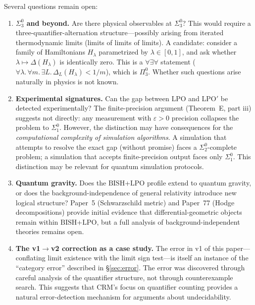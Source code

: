 \documentclass[11pt,a4paper]{article}
\theoremstyle{plain}
\theoremstyle{definition}
\newcommand{\LPO}{\ensuremath{\mathrm{LPO}}}
\newcommand{\LPOj}{\ensuremath{\mathrm{LPO'}}}
\newcommand{\BISH}{\ensuremath{\mathrm{BISH}}}
\begin{document}
Several questions remain open:
\begin{enumerate}[nosep]
\item \textbf{$\Sigma_3^0$ and beyond.}  Are there physical observables
  at $\Sigma_3^0$?  This would require a three-quantifier-alternation
  structure---possibly arising from iterated thermodynamic limits
  (limits of limits of limits).  A candidate: consider a family of
  Hamiltonians $H_\lambda$ parametrized by $\lambda \in [0,1]$, and
  ask whether $\lambda \mapsto \Delta(H_\lambda)$ is identically zero.
  This is a $\forall\exists\forall$ statement ($\forall \lambda.\,
  \forall m.\, \exists L.\, \Delta_L(H_\lambda) < 1/m$), which is
  $\Pi_3^0$.  Whether such questions arise naturally in physics is
  not known.

\item \textbf{Experimental signatures.}  Can the gap between $\LPO$
  and $\LPOj$ be detected experimentally?  The finite-precision
  argument (Theorem~E, part iii) suggests not directly: any
  measurement with $\varepsilon > 0$ precision collapses the problem
  to $\Sigma_1^0$.  However, the distinction may have consequences
  for the \emph{computational complexity of simulation algorithms}.
  A simulation that attempts to resolve the exact gap (without
  promise) faces a $\Sigma_2^0$-complete problem; a simulation
  that accepts finite-precision output faces only $\Sigma_1^0$.
  This distinction may be relevant for quantum simulation protocols.

\item \textbf{Quantum gravity.}  Does the $\BISH$+$\LPO$ profile
  extend to quantum gravity, or does the background-independence
  of general relativity introduce new logical structure?  Paper~5
  (Schwarzschild metric) and Paper~77 (Hodge decompositions)
  provide initial evidence that differential-geometric objects
  remain within $\BISH$+$\LPO$, but a full analysis of
  background-independent theories remains open.

\item \textbf{The v1$\to$v2 correction as a case study.}
  The error in v1 of this paper---conflating limit existence
  with the limit sign test---is itself an instance of the
  ``category error'' described in \S\ref{sec:error}.  The
  error was discovered through careful analysis of the
  quantifier structure, not through counterexample search.
  This suggests that CRM's focus on quantifier counting
  provides a natural error-detection mechanism for arguments
  about undecidability.
\end{enumerate}
\end{document}
